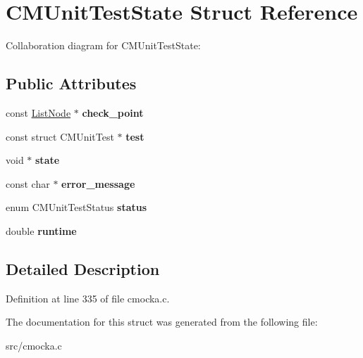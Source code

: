\hypertarget{structCMUnitTestState}{}\section{C\+M\+Unit\+Test\+State Struct Reference}
\label{structCMUnitTestState}


Collaboration diagram for C\+M\+Unit\+Test\+State\+:
\subsection*{Public Attributes}
\begin{DoxyCompactItemize}
\item 
\mbox{\label{structCMUnitTestState_ad769ff44848de44f80c93d61a7eddb17}} 
const \hyperlink{structListNode}{List\+Node} $\ast$ {\bfseries check\+\_\+point}
\item 
\mbox{\label{structCMUnitTestState_abf83fd798716db84ada52946bf11cf4c}} 
const struct C\+M\+Unit\+Test $\ast$ {\bfseries test}
\item 
\mbox{\label{structCMUnitTestState_ad923f78d81da599c113295cd33a9e959}} 
void $\ast$ {\bfseries state}
\item 
\mbox{\label{structCMUnitTestState_a9649fbe018ad0be988e4e17fb42f9d7f}} 
const char $\ast$ {\bfseries error\+\_\+message}
\item 
\mbox{\label{structCMUnitTestState_a669ce36dac14c0cc9380e336382fe415}} 
enum C\+M\+Unit\+Test\+Status {\bfseries status}
\item 
\mbox{\label{structCMUnitTestState_a9e6b7af92cff16f613c0d89022bb20de}} 
double {\bfseries runtime}
\end{DoxyCompactItemize}


\subsection{Detailed Description}


Definition at line 335 of file cmocka.\+c.



The documentation for this struct was generated from the following file\+:\begin{DoxyCompactItemize}
\item 
src/cmocka.\+c\end{DoxyCompactItemize}
